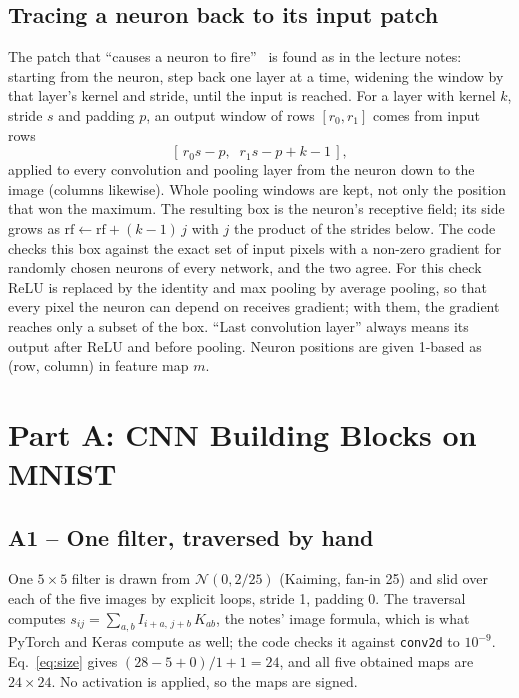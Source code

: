 \documentclass[11pt,a4paper]{article}
\newcommand{\code}[1]{\texttt{#1}}
\begin{document}
\subsection{Tracing a neuron back to its input patch}\label{sec:rf}
The patch that ``causes a neuron to fire''~\cite{zeiler} is found as in the lecture notes: starting from the
neuron, step back one layer at a time, widening the window by that layer's kernel and stride, until
the input is reached.  For a layer with kernel $k$, stride $s$ and padding $p$, an output window of
rows $[r_0, r_1]$ comes from input rows
\begin{equation}\label{eq:trace}
[\,r_0 s - p,\;\; r_1 s - p + k - 1\,],
\end{equation}
applied to every convolution and pooling layer from the neuron down to the image (columns
likewise).  Whole pooling windows are kept, not only the position that won the maximum.  The
resulting box is the neuron's receptive field; its side grows as $\text{rf} \leftarrow
\text{rf} + (k-1)\,j$ with $j$ the product of the strides below.  The code checks this box against
the exact set of input pixels with a non-zero gradient for randomly chosen neurons of every
network, and the two agree.  For this check ReLU is replaced by the identity and max pooling by
average pooling, so that every pixel the neuron can depend on receives gradient; with them, the
gradient reaches only a subset of the box.  ``Last convolution layer'' always means its output after ReLU and
before pooling.  Neuron positions are given 1-based as (row, column) in feature map $m$.

\section{Part A: CNN Building Blocks on MNIST}\label{sec:a}

\subsection{A1 -- One filter, traversed by hand}
One $5\times5$ filter is drawn from $\mathcal N(0, 2/25)$ (Kaiming, fan-in 25) and slid over each
of the five images by explicit loops, stride 1, padding 0.  The traversal computes
$s_{ij} = \sum_{a,b} I_{i+a,\,j+b}\,K_{ab}$, the notes' image formula, which is what PyTorch and
Keras compute as well; the code checks it against \code{conv2d} to $10^{-9}$.
Eq.~\eqref{eq:size} gives $(28-5+0)/1+1 = 24$, and all five obtained maps are $24\times24$.
No activation is applied, so the maps are signed.
\end{document}
